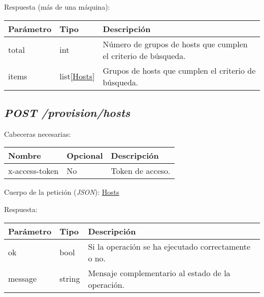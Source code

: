 Respuesta (más de una máquina):
\begin{table}[h!]
	\centering
	\begin{adjustbox}{max width=\textwidth}
	\begin{tabularx}{\linewidth}{|l|l|L|}
		\hline
		Parámetro & Tipo & Descripción \\ \hline
		total & int & Número de grupos de hosts que cumplen el criterio de búsqueda. \\ \hline
		items & list[\hyperref[sec:hosts]{Hosts}] & Grupos de hosts que cumplen el criterio de búsqueda. \\ \hline
	\end{tabularx}
\end{adjustbox}
\end{table}



\subsection{\textit{POST /provision/hosts}}

Cabeceras necesarias:
\begin{table}[h!]
	\centering
	\begin{adjustbox}{max width=\textwidth}
	\begin{tabular}{|l|l|l|}
		\hline
		Nombre & Opcional & Descripción \\ \hline
		x-access-token & No & Token de acceso. \\ \hline
	\end{tabular}
\end{adjustbox}
\end{table}

Cuerpo de la petición (\textit{JSON}): \hyperref[sec:hosts]{Hosts}

\pagebreak
Respuesta:
\begin{table}[h!]
	\centering
	\begin{adjustbox}{max width=\textwidth}
	\begin{tabular}{|l|l|l|}
		\hline
		Parámetro & Tipo & Descripción \\ \hline
		ok & bool & Si la operación se ha ejecutado correctamente o no. \\ \hline
		message & string & Mensaje complementario al estado de la operación. \\ \hline
	\end{tabular}
\end{adjustbox}
\end{table}


